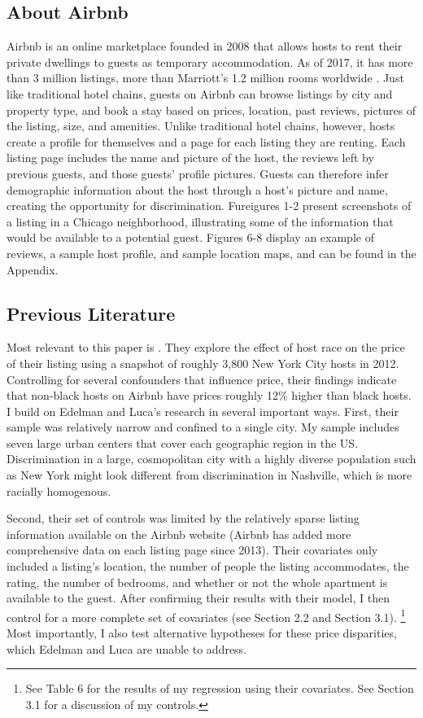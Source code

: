 \subsection{About Airbnb} 
Airbnb is an online marketplace founded in 2008 that allows hosts to rent their private dwellings to guests as temporary accommodation. As of 2017, it has more than 3 million listings, more than Marriott's 1.2 million rooms worldwide \citep{aboutus}. Just like traditional hotel chains, guests on Airbnb can browse listings by city and property type, and book a stay based on prices, location, past reviews, pictures of the listing, size, and amenities. Unlike traditional hotel chains, however, hosts create a profile for themselves and a page for each listing they are renting. Each listing page includes the name and picture of the host, the reviews left by previous guests, and those guests' profile pictures. Guests can therefore infer demographic information about the host through a host's picture and name, creating the opportunity for discrimination. Fureigures 1-2 present screenshots of a listing in a Chicago neighborhood, illustrating some of the information that would be available to a potential guest. Figures 6-8 display an example of reviews, a sample host profile, and sample location maps, and can be found in the Appendix.


\subsection{Previous Literature} 
Most relevant to this paper is \cite{edelman}. They explore the effect of host race on the price of their listing using a snapshot of roughly 3,800 New York City hosts in 2012. Controlling for several confounders that influence price, their findings indicate that non-black hosts on Airbnb have prices roughly 12\% higher than black hosts. I build on Edelman and Luca's research in several important ways. First, their sample was relatively narrow and confined to a single city. My sample includes seven large urban centers that cover each geographic region in the US. Discrimination in a large, cosmopolitan city with a highly diverse population such as New York might look different from discrimination in Nashville, which is more racially homogenous.

Second, their set of controls was limited by the relatively sparse listing information available on the Airbnb website (Airbnb has added more comprehensive data on each listing page since 2013). Their covariates only included a listing's location, the number of people the listing accommodates, the rating, the number of bedrooms, and whether or not the whole apartment is available to the guest. After confirming their results with their model, I then control for a more complete set of covariates (see Section 2.2 and Section 3.1).%
	\footnote{See Table 6 for the results of my regression using their covariates. See Section 3.1 for a discussion of my controls.} 
Most importantly, I also test alternative hypotheses for these price disparities, which Edelman and Luca are unable to address. 

